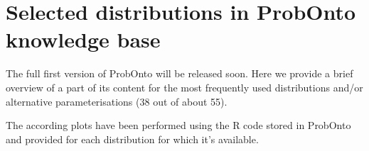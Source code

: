 

\appendix
\chapter{Selected distributions in ProbOnto knowledge base}
\label{ch:probontoAppendix}

The full first version of ProbOnto will be released soon. Here we provide 
a brief overview of a part of its content for the most frequently used distributions 
and/or alternative parameterisations (38 out of about 55). 

The according plots have been performed using the R code stored in ProbOnto 
and provided for each distribution for which it's available.


